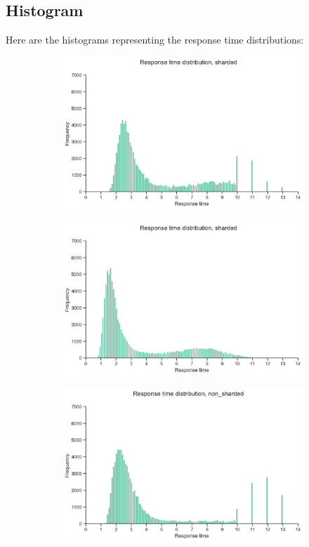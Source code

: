 \documentclass[11pt,a4paper]{article}
\begin{document}
\subsection{Histogram}

Here are the histograms representing the response time distributions:

\begin{figure}[H]
	\begin{subfigure}[b]{0.5\linewidth}
		\includegraphics[width=\linewidth]{images/gets_2/histogram_memtier.pdf}
	\end{subfigure}
	\begin{subfigure}[b]{0.5\linewidth}
		\includegraphics[width=\linewidth]{images/gets_2/histogram_middleware.pdf}
	\end{subfigure}
	\begin{subfigure}[b]{0.5\linewidth}
		\includegraphics[width=\linewidth]{images/gets_1/histogram_memtier.pdf}

\end{subfigure}
\end{figure}
\end{document}
